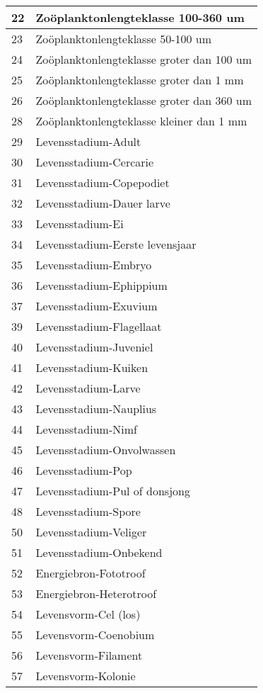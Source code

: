 \documentclass[
]{book}
\begin{document}
\begin{table}
\begin{tabular}[t]{l|l}
\hline
22 & Zoöplanktonlengteklasse 100-360 um\\
\hline
23 & Zoöplanktonlengteklasse  50-100 um\\
\hline
24 & Zoöplanktonlengteklasse groter dan 100 um\\
\hline
25 & Zoöplanktonlengteklasse groter dan 1 mm\\
\hline
26 & Zoöplanktonlengteklasse groter dan 360 um\\
\hline
28 & Zoöplanktonlengteklasse kleiner dan 1 mm\\
\hline
29 & Levensstadium-Adult\\
\hline
30 & Levensstadium-Cercarie\\
\hline
31 & Levensstadium-Copepodiet\\
\hline
32 & Levensstadium-Dauer larve\\
\hline
33 & Levensstadium-Ei\\
\hline
34 & Levensstadium-Eerste levensjaar\\
\hline
35 & Levensstadium-Embryo\\
\hline
36 & Levensstadium-Ephippium\\
\hline
37 & Levensstadium-Exuvium\\
\hline
39 & Levensstadium-Flagellaat\\
\hline
40 & Levensstadium-Juveniel\\
\hline
41 & Levensstadium-Kuiken\\
\hline
42 & Levensstadium-Larve\\
\hline
43 & Levensstadium-Nauplius\\
\hline
44 & Levensstadium-Nimf\\
\hline
45 & Levensstadium-Onvolwassen\\
\hline
46 & Levensstadium-Pop\\
\hline
47 & Levensstadium-Pul of donsjong\\
\hline
48 & Levensstadium-Spore\\
\hline
50 & Levensstadium-Veliger\\
\hline
51 & Levensstadium-Onbekend\\
\hline
52 & Energiebron-Fototroof\\
\hline
53 & Energiebron-Heterotroof\\
\hline
54 & Levensvorm-Cel (los)\\
\hline
55 & Levensvorm-Coenobium\\
\hline
56 & Levensvorm-Filament\\
\hline
57 & Levensvorm-Kolonie\\

\end{tabular}
\end{table}
\end{document}
